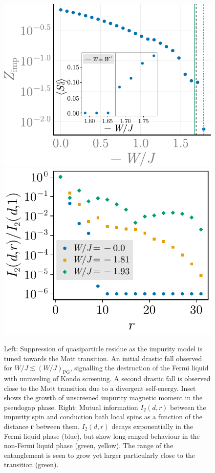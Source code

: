 \documentclass[%
 reprint,
superscriptaddress,
groupedaddress,
 amsmath,amssymb,
 aps,
prl,superscriptaddress
]{revtex4-2}
\begin{document}
\begin{figure}
    \centering
    \includegraphics[width=0.49\linewidth]{localQPResidue.pdf}
    \includegraphics[width=0.49\linewidth]{I2-di_69-2000.pdf}
    \caption{Left: Suppression of quasiparticle residue as the impurity model is tuned towards the Mott transition. An initial drastic fall observed for $W/J \lesssim (W/J)_\text{PG}$, signalling the destruction of the Fermi liquid with unraveling of Kondo screening. A second drastic fall is observed close to the Mott transition due to a divergent self-energy. Inset shows the growth of unscreened impurity magnetic moment in the pseudogap phase. 
    Right: Mutual information $I_{2}(d,r)$ between the impurity spin and conduction bath local spins as a function of the distance {\bf r} between them. $I_{2}(d,r)$ decays exponentially in the Fermi liquid phase (blue), but show long-ranged behaviour in the non-Fermi liquid phase (green, yellow). The range of the entanglement is seen to grow yet larger particularly close to the transition (green).
    }
    \label{channelDecoupling}
\end{figure}
\end{document}
